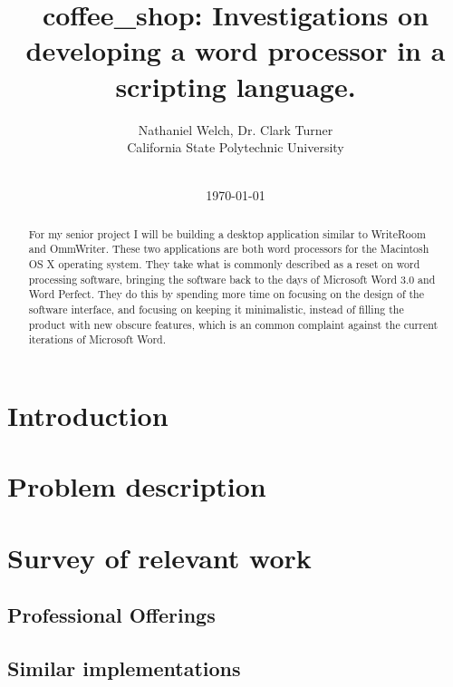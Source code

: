 \documentclass[11pt]{article}
\begin{document}
\title{\vfill coffee\_shop: Investigations on developing a word processor in a scripting language.} %
\author{
Nathaniel Welch, Dr. Clark Turner\vspace{10pt} \\
California State Polytechnic University\vspace{10pt} \\
\vspace{10pt} \\
}
\date{\today}
\maketitle

\vfill
\begin{abstract}
For my senior project I will be building a desktop application similar to WriteRoom and OmmWriter. These two applications are both word processors for the Macintosh OS X operating system. They take what is commonly described as a reset on word processing software, bringing the software back to the days of Microsoft Word 3.0 and Word Perfect. They do this by spending more time on focusing on the design of the software interface, and focusing on keeping it minimalistic, instead of filling the product with new obscure features, which is an common complaint against the current iterations of Microsoft Word.
\end{abstract}

\thispagestyle{empty}
% 

\newpage

\section{Introduction}

\section{Problem description}

\section{Survey of relevant work}
\subsection{Professional Offerings}
\subsection{Similar implementations}
\end{document}
